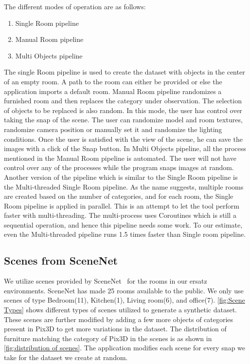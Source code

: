 The different modes of operation are as follows:
\begin{enumerate}
\item Single Room pipeline
\item Manual Room pipeline
\item Multi Objects pipeline
\end{enumerate}

The single Room pipeline is used to create the dataset with objects in the center of an empty room.
A path to the room can either be provided or else the application imports a default room.
Manual Room pipeline randomizes a furnished room and then replaces the category under observation.
The selection of objects to be replaced is also random.
In this mode, the user has control over taking the snap of the scene.
The user can randomize model and room textures, randomize camera position or manually set it and randomize the lighting conditions.
Once the user is satisfied with the view of the scene, he can save the images with a click of the Snap button.
In Multi Objects pipeline, all the process mentioned in the Manual Room pipeline is automated.
The user will not have control over any of the processes while the program snaps images at random.
Another version of the pipeline which is similar to the Single Room pipeline is the Multi-threaded Single Room pipeline.
As the name suggests, multiple rooms are created based on the number of categories, and for each room, the Single Room pipeline is applied in parallel.
This is an attempt to let the tool perform faster with multi-threading.
The multi-process uses Coroutines which is still a sequential operation, and hence this pipeline needs some work.
To our estimate, even the Multi-threaded pipeline runs 1.5 times faster than Single room pipeline.

\subsection{Scenes from SceneNet}\label{subsec:scenes-from-scenenet}
We utilize scenes provided by SceneNet~\cite{McCormac:etal:ICCV2017} for the rooms in our ersatz environments.
SceneNet has made 25 rooms available to the public.
We only use scenes of type Bedroom(11), Kitchen(1), Living room(6), and office(7).
\autoref{fig:Scene Types} shows different types of scenes utilized to generate a synthetic dataset.
These scenes are further modified by adding a few more objects of categories present in Pix3D to get more variations in the dataset.
The distribution of furniture matching the category of Pix3D in the scenes is as shown in \autoref{fig:distribution of scenes}.
The application modifies each scene for every snap we take for the dataset we create at random.

